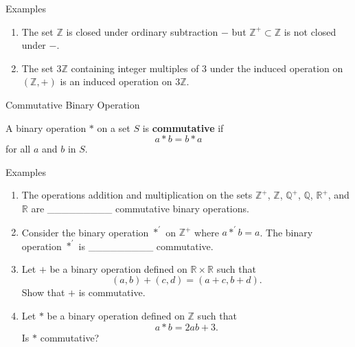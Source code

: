 \documentclass{beamer}
\begin{document}
\begin{frame}{Examples}
\begin{enumerate}
\justifying
\item The set $\mathbb{Z}$ is closed under ordinary subtraction $-$ but $\mathbb{Z}^+ \subset \mathbb{Z}$ is not closed under $-$.
\pause
\item The set $3\mathbb{Z}$ containing integer multiples of $3$ under the induced operation on $(\mathbb{Z}, +)$ is an induced operation on $3\mathbb{Z}$.
\pause
\end{enumerate}
\end{frame}

\begin{frame}{Commutative Binary Operation}
\begin{definition}
\justifying
A binary operation $*$ on a set $S$ is \textbf{commutative} if $$a * b = b * a$$ for all $a$ and $b$ in $S$.
\end{definition}
\end{frame}

\begin{frame}{Examples}
\begin{enumerate}
\justifying
\item The operations addition and multiplication on the sets $\mathbb{Z}^+$, $\mathbb{Z}$, $\mathbb{Q}^+$, $\mathbb{Q}$, $\mathbb{R}^+$, and $\mathbb{R}$ are \_\_\_\_\_\_\_\_\_ commutative binary operations.
\item Consider the binary operation $*^{\prime}$ on $\mathbb{Z}^+$ where $a *^{\prime} b = a$. The binary operation $*^{\prime}$ is \_\_\_\_\_\_\_\_\_ commutative.
\item Let $+$ be a binary operation defined on $\mathbb{R} \times \mathbb{R}$ such that $$(a, b) + (c, d) = (a + c, b + d).$$ Show that $+$ is commutative.
\item Let $*$ be a binary operation defined on $\mathbb{Z}$ such that $$a * b = 2ab + 3.$$ Is $*$ commutative?
\end{enumerate}
\end{frame}
\end{document}
